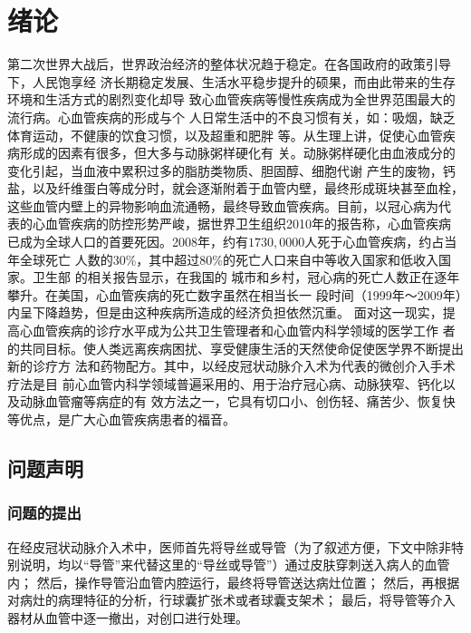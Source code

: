 \chapter{绪\;\;\;论}
\label{chap1}

第二次世界大战后，世界政治经济的整体状况趋于稳定。在各国政府的政策引导下，人民饱享经
济长期稳定发展、生活水平稳步提升的硕果，而由此带来的生存环境和生活方式的剧烈变化却导
致心血管疾病等慢性疾病成为全世界范围最大的流行病\cite{Hu2009}。心血管疾病的形成与个
人日常生活中的不良习惯有关，如：吸烟，缺乏体育运动，不健康的饮食习惯，以及超重和肥胖
等\cite{Go2013}。从生理上讲，促使心血管疾病形成的因素有很多，但大多与动脉粥样硬化有
关。动脉粥样硬化由血液成分的变化引起，当血液中累积过多的脂肪类物质、胆固醇、细胞代谢
产生的废物，钙盐，以及纤维蛋白等成分时，就会逐渐附着于血管内壁，最终形成斑块甚至血栓，
这些血管内壁上的异物影响血流通畅，最终导致血管疾病\cite{cvdaha}。目前，以冠心病为代
表的心血管疾病的防控形势严峻，据世界卫生组织2010年的报告\cite{mho2011}称，心血管疾病
已成为全球人口的首要死因。2008年，约有$1730,0000$人死于心血管疾病，约占当年全球死亡
人数的30\%，其中超过80\%的死亡人口来自中等收入国家和低收入国家\cite{mho2011}。卫生部
的相关报告\cite{moh2010annual}\cite{moh2007annual}\cite{moh2004annual}显示，在我国的
城市和乡村，冠心病的死亡人数正在逐年攀升。在美国，心血管疾病的死亡数字虽然在相当长一
段时间（1999年～2009年）内呈下降趋势，但是由这种疾病所造成的经济负担依然沉重\cite{Go2013}。
面对这一现实，提高心血管疾病的诊疗水平成为公共卫生管理者和心血管内科学领域的医学工作
者的共同目标。使人类远离疾病困扰、享受健康生活的天然使命促使医学界不断提出新的诊疗方
法和药物配方。其中，以经皮冠状动脉介入术\cite{Baim2005}为代表的微创介入手术疗法是目
前心血管内科学领域普遍采用的、用于治疗冠心病、动脉狭窄、钙化以及动脉血管瘤等病症的有
效方法之一，它具有切口小、创伤轻、痛苦少、恢复快等优点，是广大心血管疾病患者的福音。

\section{问题声明}
\label{sec1-1}

\subsection{问题的提出}
\label{subsec1-1-1}

在经皮冠状动脉介入术中，医师首先将导丝或导管（为了叙述方便，下文中除非特别说明，均以“导管”来代替这里的“导丝或导管”）通过皮肤穿刺送入病人的血管内；
然后，操作导管沿血管内腔运行，最终将导管送达病灶位置；
然后，再根据对病灶的病理特征的分析，行球囊扩张术或者球囊支架术；
最后，将导管等介入器材从血管中逐一撤出，对创口进行处理。

